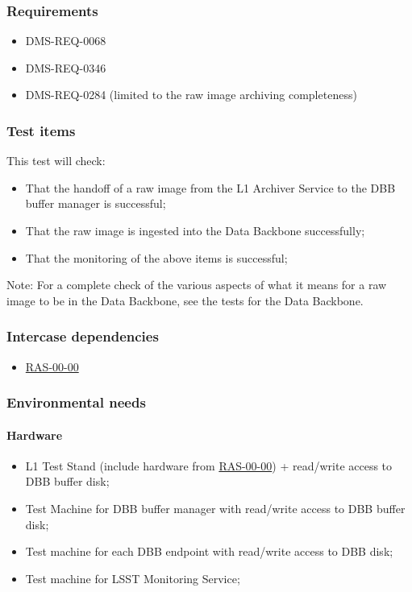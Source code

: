 \documentclass[DM,lsstdraft,STS,toc]{lsstdoc}
\begin{document}
\subsubsection{Requirements}


\begin{itemize}
\item{DMS-REQ-0068}
\item{DMS-REQ-0346}
\item{DMS-REQ-0284 (limited to the raw image archiving completeness)}
\end{itemize}


\subsubsection{Test items}


This test will check:
\begin{itemize}
\item{That the handoff of a raw image from the L1 Archiver Service to the DBB buffer
manager is successful;}
\item{That the raw image is ingested into the Data Backbone successfully;}
\item{That the monitoring of the above items is successful;}
\end{itemize}


Note: For a complete check of the various aspects of what it means for
a raw image to be in the Data Backbone, see the tests for the Data Backbone.

\subsubsection{Intercase dependencies}
\begin{itemize}
\item{\hyperref[ras-00-00]{RAS-00-00}}
\end{itemize}


\subsubsection{Environmental needs}
\paragraph{Hardware}
\begin{itemize}
\item{L1 Test Stand (include hardware from \hyperref[ras-00-00]{RAS-00-00}) + read/write access to DBB buffer disk;}
\item{Test Machine for DBB buffer manager with read/write access to DBB buffer disk;}
\item{Test machine for each DBB endpoint with read/write access to DBB disk;}
\item{Test machine for LSST Monitoring Service;}
\end{itemize}
\end{document}
